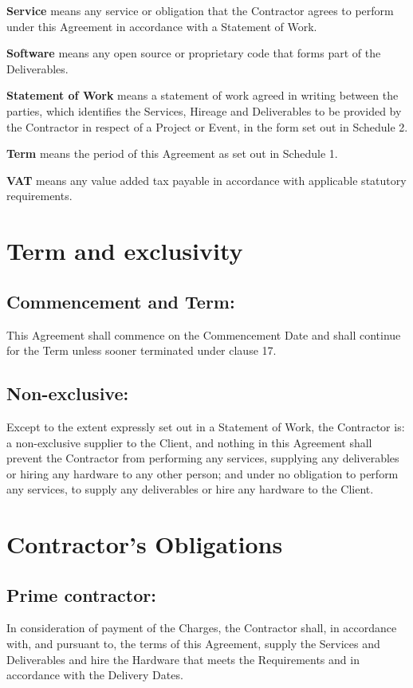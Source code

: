 \documentclass[a4paper,12pt]{article}
\begin{document}
\textbf{Service} means any service or obligation that the Contractor agrees to perform under this Agreement in accordance with a Statement of Work.

\textbf{Software} means any open source or proprietary code that forms part of the Deliverables.

\textbf{Statement of Work} means a statement of work agreed in writing between the parties, which identifies the Services, Hireage and Deliverables to be provided by the Contractor in respect of a Project or Event, in the form set out in Schedule 2.

\textbf{Term} means the period of this Agreement as set out in Schedule 1.

\textbf{VAT} means any value added tax payable in accordance with applicable statutory requirements.

\section{Term and exclusivity}
\subsection{Commencement and Term:} This Agreement shall commence on the Commencement Date and shall continue for the Term unless sooner terminated under clause 17.
\subsection{Non-exclusive:}  Except to the extent expressly set out in a Statement of Work, the Contractor is:
a non-exclusive supplier to the Client, and nothing in this Agreement shall prevent the Contractor from performing any services, supplying any deliverables or hiring any hardware to any other person; and
under no obligation to perform any services, to supply any deliverables or hire any hardware to the Client.
\section{Contractor’s Obligations}
\subsection{Prime contractor:}  In consideration of payment of the Charges, the Contractor shall, in accordance with, and pursuant to, the terms of this Agreement, supply the Services and Deliverables and hire the Hardware that meets the Requirements and in accordance with the Delivery Dates.  
\end{document}
